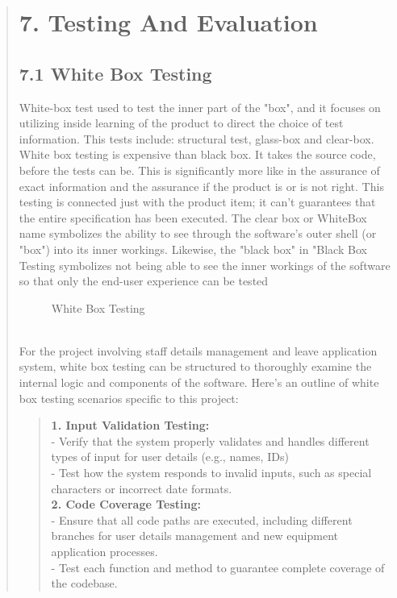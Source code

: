 \documentclass[12pt]{report}
\begin{document}
	
	\begin{quote}
		\section{7. Testing And Evaluation}
		\subsection{7.1 White Box Testing}
		White-box test used to test the inner part of the "box", and it focuses on utilizing inside learning of the product to direct the choice of test information. This tests include: structural test, glass-box and clear-box. White box testing is expensive than black box. It takes the source code, before the tests can be. This is significantly more like in the assurance of exact information and the assurance if the product is or is not right. This testing is connected just with the product item; it can't guarantees that the entire specification has been executed. The clear box or WhiteBox name symbolizes the ability to see through the software's outer shell (or "box") into its inner workings. Likewise, the "black box" in "Black Box Testing symbolizes not being able to see the inner workings of the software so that only the end-user experience can be tested
		\begin{figure}
			\centering
			\caption{White Box Testing}
		\end{figure}\\
		
		For the project involving staff details management and leave application system, white box testing can be structured to thoroughly examine the internal logic and components of the software. Here's an outline of white box testing scenarios specific to this project:
		\begin{quote}
			\textbf{1. Input Validation Testing:}\\
			- Verify that the system properly validates and handles different types of input for user details (e.g., names, IDs)\\
			- Test how the system responds to invalid inputs, such as special characters or incorrect date formats.\\
			\clearpage
			\textbf{2. Code Coverage Testing:}\\
			- Ensure that all code paths are executed, including different branches for user details management and new equipment application processes.\\
			- Test each function and method to guarantee complete coverage of the codebase.\\
			

\end{quote}
\end{quote}
\end{document}
